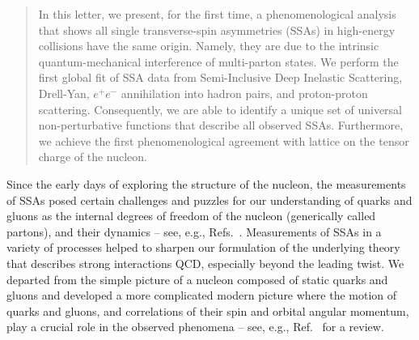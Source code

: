 \documentclass[twocolumn,prl,aps,superscriptaddress
               ,footinbib,amsfonts,amsmath,amssymb,showpacs]{revtex4-1}
\begin{document}
\begin{abstract}
\noindent 
In this letter, we present, for the first time, a phenomenological
analysis that shows all single transverse-spin asymmetries (SSAs) in
high-energy collisions have the same origin.  
Namely, they are due to the intrinsic quantum-mechanical interference
of multi-parton states.
We perform the first global fit of SSA data from  Semi-Inclusive Deep
Inelastic Scattering, Drell-Yan, $e^+e^-$ annihilation into hadron
pairs, and proton-proton scattering.
Consequently, we are able to identify a unique set of universal 
non-perturbative functions that describe all observed SSAs.
Furthermore, we achieve the first phenomenological agreement with
lattice on the tensor charge of the nucleon.
\end{abstract}

\pacs{}
\maketitle

Since the early days of exploring the structure of the nucleon, the
measurements of SSAs posed
certain challenges and puzzles for our understanding of quarks and
gluons as the internal degrees of freedom of the nucleon (generically
called partons), and their dynamics -- see, e.g.,
Refs.~\cite{Bunce:1976yb,Kane:1978nd}. 
%
Measurements of SSAs in a variety of processes helped to sharpen our
formulation of the underlying theory that describes strong
interactions QCD, especially beyond the leading twist.
%
We departed from the simple picture of a nucleon composed of static
quarks and gluons and developed a more complicated modern picture
where the motion of quarks and gluons, and correlations of their spin
and orbital angular momentum, play a crucial role 
in the observed phenomena
-- see, e.g.,
Ref.~\cite{Perdekamp:2015vwa} for a review. 
\end{document}
